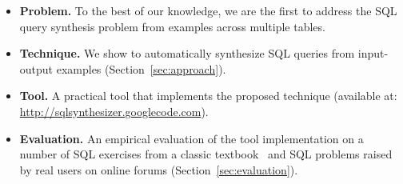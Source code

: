 \begin{itemize}
\item \textbf{Problem.} To the best of our knowledge, we are the first
to address the SQL query synthesis problem from examples across multiple
tables.

\item \textbf{Technique.} We show to automatically synthesize SQL
queries from input-output examples (Section~\ref{sec:approach}).

\item \textbf{Tool.} A practical tool that implements the proposed technique (available at:
\url{http://sqlsynthesizer.googlecode.com}).

\item \textbf{Evaluation.} An empirical evaluation of the tool implementation
on a number of SQL exercises from a classic textbook~\cite{cowbook}
and SQL problems raised by real users on online forums (Section~\ref{sec:evaluation}).
\end{itemize}
